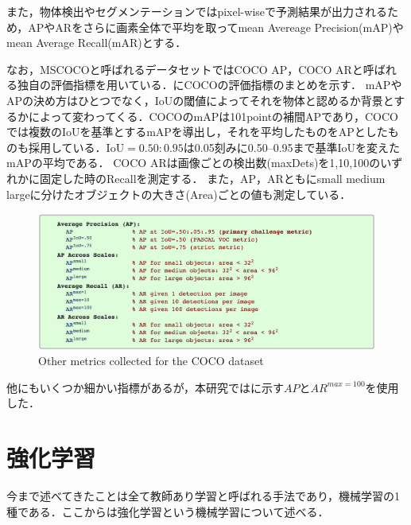 また，物体検出やセグメンテーションではpixel-wiseで予測結果が出力されるため，APやARをさらに画素全体で平均を取ってmean Avereage Precision(mAP)やmean Average Recall(mAR)とする．

なお，MSCOCOと呼ばれるデータセット\cite{COCO論文}ではCOCO AP，COCO ARと呼ばれる独自の評価指標を用いている．にCOCOの評価指標のまとめを示す．
mAPやAPの決め方はひとつでなく，IoUの閾値によってそれを物体と認めるか背景とするかによって変わってくる．COCOのmAPは101pointの補間APであり，COCOでは複数のIoUを基準とするmAPを導出し，それを平均したものをAPとしたものも採用している．$\mathrm{IoU} = 0.50:0.95$は0.05刻みに0.50--0.95まで基準IoUを変えたmAPの平均である．
COCO ARは画像ごとの検出数(maxDets)を1,10,100のいずれかに固定した時のRecallを測定する．
また，AP，ARともにsmall \/ medium \/ largeに分けたオブジェクトの大きさ(Area)ごとの値も測定している．

\begin{figure}[H]
    \centering
    \includegraphics[width=\linewidth]{figure/chapter2/cocoAP}
    \caption[Other metrics collected for the COCO dataset.]{Other metrics collected for the COCO dataset\cite{COCOサイト}}
    \label{fig:COCOAP}
\end{figure}

他にもいくつか細かい指標があるが，本研究ではに示す$AP$と$AR^{max=100}$を使用した．

\section{強化学習}\label{sec:強化学習}
今まで述べてきたことは全て教師あり学習と呼ばれる手法であり，機械学習の1種である．ここからは強化学習という機械学習について述べる．

